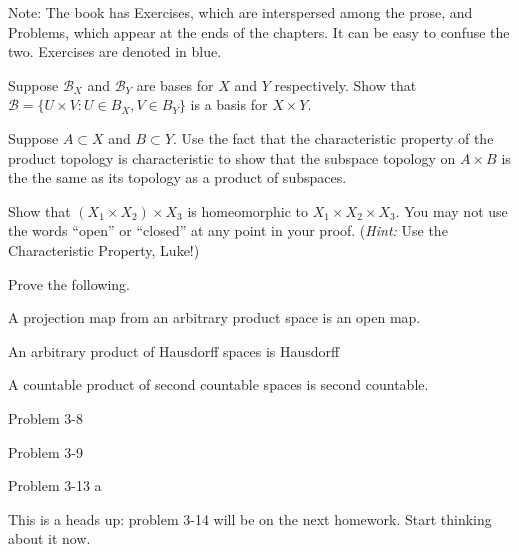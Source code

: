 \documentclass[minion]{homework651}
\begin{document}
Note: The book has Exercises, which are interspersed among the
prose, and Problems, which appear at the ends of the chapters.
It can be easy to confuse the two.  Exercises are denoted in blue.


\begin{problems}

\problem Suppose $\mathcal B_X$ and $\mathcal B_Y$ are bases for $X$ and $Y$ respectively.
Show that $\mathcal B = \{U\times V: U\in B_X, V\in B_Y\}$ is a basis for $X\times Y$.

\problem Suppose $A\subset X$ and $B\subset Y$.  Use the fact that
the characteristic property of the product topology is characteristic to
show that the subspace topology on $A\times B$ is the the same as its
topology as a product of subspaces.

\problem Show that $(X_1\times X_2)\times X_3$ is homeomorphic to $X_1\times X_2 \times X_3$.
You may not use the words ``open'' or ``closed'' at any point in your proof.  (\textit{Hint:} Use the Characteristic Property, Luke!)

\problem Prove the following.
\begin{subproblems}

\item A projection map from an arbitrary product space is an open map.

\item An arbitrary product of Hausdorff spaces is Hausdorff

\item A countable product of second countable spaces is second countable.

\end{subproblems}

\problem  Problem 3-8

\problem  Problem 3-9

\problem  Problem 3-13 a

\problem {}

\problem This is a heads up: problem 3-14 will be on the next homework.  Start thinking about it now.  
\end{problems}
\end{document}
